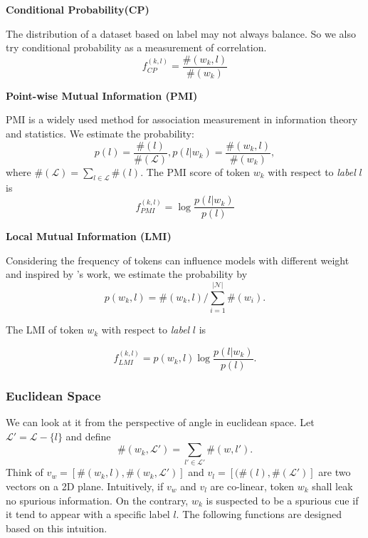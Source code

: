 \noindent\textbf{Conditional Probability(CP)}

The distribution of a dataset based on label may not always balance. 
So we also try conditional probability as a measurement of correlation.
\begin{equation}
    f_{CP}^{(k,l)} = \frac{\#(w_k, l)}{\#(w_k)}
\end{equation}

\noindent\textbf{Point-wise Mutual Information (PMI)}

PMI is a widely used method for association measurement in information theory and statistics.
We estimate the probability:
\begin{equation}
p(l) = \frac{\#(l)}{\#(\mathcal{L})}, p(l|w_k) = \frac{\#(w_k, l)}{\#(w_k)},
\end{equation}
where $\#(\mathcal{L}) = \sum_{l\in \mathcal{L}} \#(l)$.
The PMI score of token $w_k$ with respect to \textit{label} $l$ is
\begin{equation}
    f_{PMI}^{(k,l)} = \log \frac{p(l|w_k)}{p(l)}
\end{equation}

\noindent\textbf{Local Mutual Information (LMI)}

Considering the frequency of tokens can influence models with different weight and inspired 
by \citealp{schuster2019towards}'s work,
we estimate the probability by
\begin{equation}
    p(w_k, l) = \#(w_k, l) / \sum_{i=1}^{|\mathcal{N}|}\#(w_i).
\end{equation}

The LMI of token $w_k$ with respect to \textit{label} $l$ is 

\begin{equation}
    f_{LMI}^{(k,l)} = p(w_k, l)\log \frac{p(l|w_k)}{p(l)}.
\end{equation}

\subsubsection{Euclidean Space}

We can look at it from the perspective of angle in euclidean space.
Let $\mathcal{L'} = \mathcal{L} - \{l\}$ and define 
\begin{equation}
    \#(w_k, \mathcal{L'}) = \sum_{l' \in \mathcal{L'}} \#(w, l').
\end{equation}
Think of $v_w=[\#(w_k, l), \#(w_k, \mathcal{L'})]$ and $v_l = [(\#(l), \#(\mathcal{L'})]$ are two vectors on a 2D plane. 
Intuitively, if $v_w$ and $v_l$ are co-linear, token $w_k$ shall leak no spurious information. 
On the contrary, $w_k$ is suspected to be a spurious cue if it tend to appear with a specific
label $l$. The following functions are designed based on this intuition.

